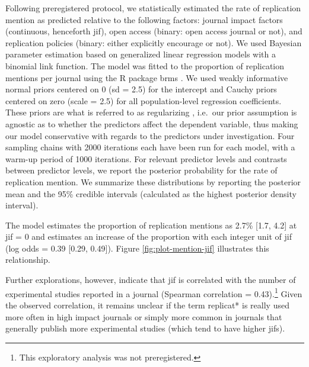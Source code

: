 \documentclass[cm,linguex]{glossa}
\begin{document}
Following preregistered protocol, we statistically estimated the rate of replication mention as predicted relative to the following factors:
journal impact factors (continuous, henceforth jif), open access (binary: open access journal or not), and replication policies (binary: either explicitly encourage or not).
We used Bayesian parameter estimation based on generalized linear regression models with a binomial link function.
The model was fitted to the proportion of replication mentions per journal using the R package brms \citep{burkner_brms_2016}.
We used weakly informative normal priors centered on 0 (sd = 2.5) for the intercept and Cauchy priors centered on zero (scale = 2.5) for all population-level regression coefficients.
These priors are what is referred to as regularizing \citep{gelman_weakly_2008}, i.e.~our prior assumption is agnostic as to whether the predictors affect the dependent variable, thus making our model conservative with regards to the predictors under investigation.
Four sampling chains with 2000 iterations each have been run for each model, with a warm-up period of 1000 iterations.
For relevant predictor levels and contrasts between predictor levels, we report the posterior probability for the rate of replication mention.
We summarize these distributions by reporting the posterior mean and the 95\% credible intervals (calculated as the highest posterior density interval).

The model estimates the proportion of replication mentions as 2.7\% {[}1.7, 4.2{]} at jif = 0 and estimates an increase of the proportion with each integer unit of jif (log odds = 0.39 {[}0.29, 0.49{]}).
Figure \ref{fig:plot-mention-jif} illustrates this relationship.

Further explorations, however, indicate that jif is correlated with the number of experimental studies reported in a journal (Spearman correlation = 0.43).\footnote{This exploratory analysis was not preregistered.}
Given the observed correlation, it remains unclear if the term replicat* is really used more often in high impact journals or simply more common in journals that generally publish more experimental studies (which tend to have higher jifs).
\end{document}
